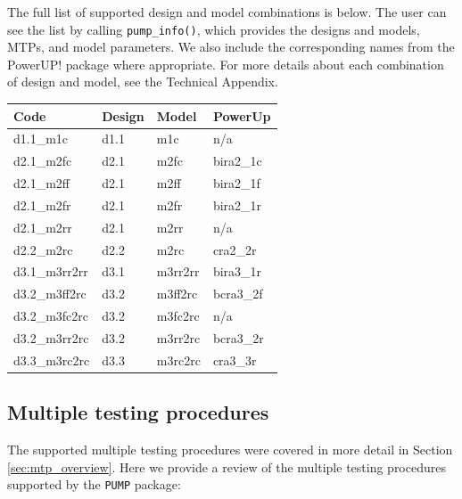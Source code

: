 \documentclass{article}
\begin{document}
The full list of supported design and model combinations is below. The
user can see the list by calling \texttt{pump\_info()}, which provides
the designs and models, MTPs, and model parameters. We also include the
corresponding names from the PowerUP! package where appropriate. For
more details about each combination of design and model, see the
Technical Appendix.

\begin{table}
\centering
\begin{tabular}{llll}
\toprule
Code & Design & Model & PowerUp\\
\midrule
d1.1\_m1c & d1.1 & m1c & n/a\\
d2.1\_m2fc & d2.1 & m2fc & bira2\_1c\\
d2.1\_m2ff & d2.1 & m2ff & bira2\_1f\\
d2.1\_m2fr & d2.1 & m2fr & bira2\_1r\\
d2.1\_m2rr & d2.1 & m2rr & n/a\\
\addlinespace
d2.2\_m2rc & d2.2 & m2rc & cra2\_2r\\
d3.1\_m3rr2rr & d3.1 & m3rr2rr & bira3\_1r\\
d3.2\_m3ff2rc & d3.2 & m3ff2rc & bcra3\_2f\\
d3.2\_m3fc2rc & d3.2 & m3fc2rc & n/a\\
d3.2\_m3rr2rc & d3.2 & m3rr2rc & bcra3\_2r\\
\addlinespace
d3.3\_m3rc2rc & d3.3 & m3rc2rc & cra3\_3r\\
\bottomrule
\end{tabular}
\end{table}

\subsection{Multiple testing procedures}

The supported multiple testing procedures were covered in more detail in
Section \ref{sec:mtp_overview}. Here we provide a review of the multiple
testing procedures supported by the \texttt{PUMP} package:
\end{document}
